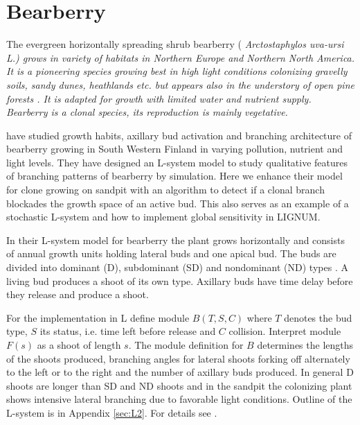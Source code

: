 \section{Bearberry}\label{sec:bearberry}

The   evergreen   horizontally    spreading   shrub   bearberry   (\it
Arctostaphylos  uva-ursi \rm  L.)   grows in  variety  of habitats  in
Northern  Europe  and Northern  North  America.   It  is a  pioneering
species  growing best  in  high light  conditions colonizing  gravelly
soils,  sandy  dunes,  heathlands   etc.   but  appears  also  in  the
understory of open pine forests \citep{salemaa:99}.  It is adapted for
growth with limited water and  nutrient supply.  Bearberry is a clonal
species, its reproduction is mainly vegetative.

\citet{salemaa:02} have studied growth habits, axillary bud activation
and  branching  architecture of  bearberry  growing  in South  Western
Finland in  varying pollution, nutrient  and light levels.   They have
designed an L-system model  to study qualitative features of branching
patterns of bearberry by simulation.   Here we enhance their model for
clone  growing on  sandpit with  an algorithm  to detect  if  a clonal
branch blockades the  growth space of an active  bud. This also serves
as  an example  of  a  stochastic L-system  \citep{pp:90}  and how  to
implement global sensitivity \citep{kurth:94} in LIGNUM.

In  their L-system  model for  bearberry \citep{salemaa:02}  the plant
grows horizontally and consists of annual growth units holding lateral
buds  and one apical  bud.  The  buds are  divided into  dominant (D),
subdominant  (SD) and nondominant  (ND) types  \citep{remphrey:83}.  A
living bud produces a shoot of  its own type.  Axillary buds have time
delay before they release and produce a shoot.

For the implementation in L define module $B(T,S,C)$ where $T$ denotes
the bud type,  $S$ its status, i.e.  time left  before release and $C$
collision.  Interpret  module $F(s)$  as a shoot  of length  $s$.  The
module  definition  for  $B$  determines  the lengths  of  the  shoots
produced, branching angles for  lateral shoots forking off alternately
to the left or to the  right and the number of axillary buds produced.
In  general D  shoots are  longer than  SD and  ND shoots  and  in the
sandpit the colonizing plant  shows intensive lateral branching due to
favorable light  conditions.  Outline of  the L-system is  in Appendix
\ref{sec:L2}.  For details see \citet{salemaa:02}.

